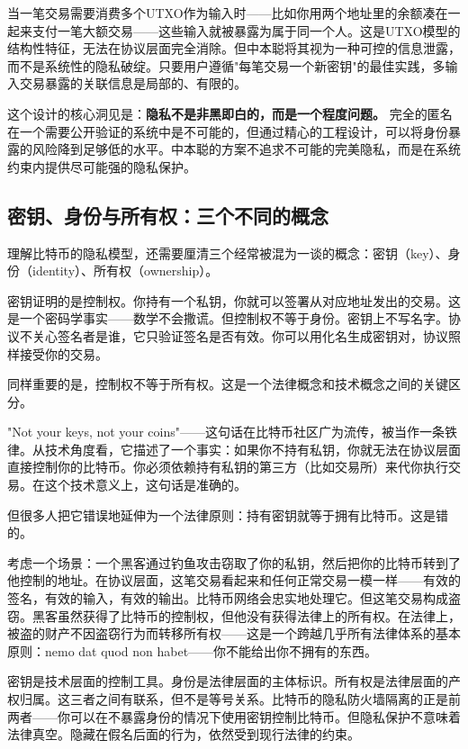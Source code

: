 \documentclass[a4paper,12pt,openany]{ctexbook}
\begin{document}
当一笔交易需要消费多个UTXO作为输入时——比如你用两个地址里的余额凑在一起来支付一笔大额交易——这些输入就被暴露为属于同一个人。这是UTXO模型的结构性特征，无法在协议层面完全消除。但中本聪将其视为一种可控的信息泄露，而不是系统性的隐私破绽。只要用户遵循"每笔交易一个新密钥"的最佳实践，多输入交易暴露的关联信息是局部的、有限的。

这个设计的核心洞见是：\textbf{隐私不是非黑即白的，而是一个程度问题。} 完全的匿名在一个需要公开验证的系统中是不可能的，但通过精心的工程设计，可以将身份暴露的风险降到足够低的水平。中本聪的方案不追求不可能的完美隐私，而是在系统约束内提供尽可能强的隐私保护。


\subsection*{密钥、身份与所有权：三个不同的概念}


理解比特币的隐私模型，还需要厘清三个经常被混为一谈的概念：密钥（key）、身份（identity）、所有权（ownership）。

密钥证明的是控制权。你持有一个私钥，你就可以签署从对应地址发出的交易。这是一个密码学事实——数学不会撒谎。但控制权不等于身份。密钥上不写名字。协议不关心签名者是谁，它只验证签名是否有效。你可以用化名生成密钥对，协议照样接受你的交易。

同样重要的是，控制权不等于所有权。这是一个法律概念和技术概念之间的关键区分。

"Not your keys, not your coins"——这句话在比特币社区广为流传，被当作一条铁律。从技术角度看，它描述了一个事实：如果你不持有私钥，你就无法在协议层面直接控制你的比特币。你必须依赖持有私钥的第三方（比如交易所）来代你执行交易。在这个技术意义上，这句话是准确的。

但很多人把它错误地延伸为一个法律原则：持有密钥就等于拥有比特币。这是错的。

考虑一个场景：一个黑客通过钓鱼攻击窃取了你的私钥，然后把你的比特币转到了他控制的地址。在协议层面，这笔交易看起来和任何正常交易一模一样——有效的签名，有效的输入，有效的输出。比特币网络会忠实地处理它。但这笔交易构成盗窃。黑客虽然获得了比特币的控制权，但他没有获得法律上的所有权。在法律上，被盗的财产不因盗窃行为而转移所有权——这是一个跨越几乎所有法律体系的基本原则：nemo dat quod non habet——你不能给出你不拥有的东西。

密钥是技术层面的控制工具。身份是法律层面的主体标识。所有权是法律层面的产权归属。这三者之间有联系，但不是等号关系。比特币的隐私防火墙隔离的正是前两者——你可以在不暴露身份的情况下使用密钥控制比特币。但隐私保护不意味着法律真空。隐藏在假名后面的行为，依然受到现行法律的约束。
\end{document}

